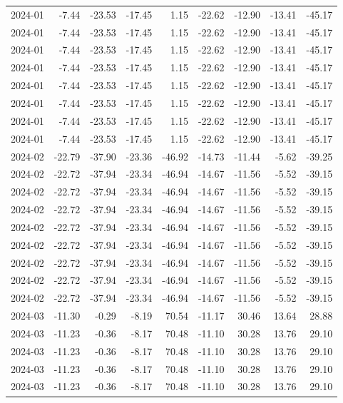 \begin{table}[ht]
\begin{tabular}{lrrrrrrrr}
  2024-01 & -7.44 & -23.53 & -17.45 & 1.15 & -22.62 & -12.90 & -13.41 & -45.17 \\ 
  2024-01 & -7.44 & -23.53 & -17.45 & 1.15 & -22.62 & -12.90 & -13.41 & -45.17 \\ 
  2024-01 & -7.44 & -23.53 & -17.45 & 1.15 & -22.62 & -12.90 & -13.41 & -45.17 \\ 
  2024-01 & -7.44 & -23.53 & -17.45 & 1.15 & -22.62 & -12.90 & -13.41 & -45.17 \\ 
  2024-01 & -7.44 & -23.53 & -17.45 & 1.15 & -22.62 & -12.90 & -13.41 & -45.17 \\ 
  2024-01 & -7.44 & -23.53 & -17.45 & 1.15 & -22.62 & -12.90 & -13.41 & -45.17 \\ 
  2024-01 & -7.44 & -23.53 & -17.45 & 1.15 & -22.62 & -12.90 & -13.41 & -45.17 \\ 
  2024-01 & -7.44 & -23.53 & -17.45 & 1.15 & -22.62 & -12.90 & -13.41 & -45.17 \\ 
  2024-02 & -22.79 & -37.90 & -23.36 & -46.92 & -14.73 & -11.44 & -5.62 & -39.25 \\ 
  2024-02 & -22.72 & -37.94 & -23.34 & -46.94 & -14.67 & -11.56 & -5.52 & -39.15 \\ 
  2024-02 & -22.72 & -37.94 & -23.34 & -46.94 & -14.67 & -11.56 & -5.52 & -39.15 \\ 
  2024-02 & -22.72 & -37.94 & -23.34 & -46.94 & -14.67 & -11.56 & -5.52 & -39.15 \\ 
  2024-02 & -22.72 & -37.94 & -23.34 & -46.94 & -14.67 & -11.56 & -5.52 & -39.15 \\ 
  2024-02 & -22.72 & -37.94 & -23.34 & -46.94 & -14.67 & -11.56 & -5.52 & -39.15 \\ 
  2024-02 & -22.72 & -37.94 & -23.34 & -46.94 & -14.67 & -11.56 & -5.52 & -39.15 \\ 
  2024-02 & -22.72 & -37.94 & -23.34 & -46.94 & -14.67 & -11.56 & -5.52 & -39.15 \\ 
  2024-02 & -22.72 & -37.94 & -23.34 & -46.94 & -14.67 & -11.56 & -5.52 & -39.15 \\ 
  2024-03 & -11.30 & -0.29 & -8.19 & 70.54 & -11.17 & 30.46 & 13.64 & 28.88 \\ 
  2024-03 & -11.23 & -0.36 & -8.17 & 70.48 & -11.10 & 30.28 & 13.76 & 29.10 \\ 
  2024-03 & -11.23 & -0.36 & -8.17 & 70.48 & -11.10 & 30.28 & 13.76 & 29.10 \\ 
  2024-03 & -11.23 & -0.36 & -8.17 & 70.48 & -11.10 & 30.28 & 13.76 & 29.10 \\ 
  2024-03 & -11.23 & -0.36 & -8.17 & 70.48 & -11.10 & 30.28 & 13.76 & 29.10 \\ 

\end{tabular}
\end{table}
